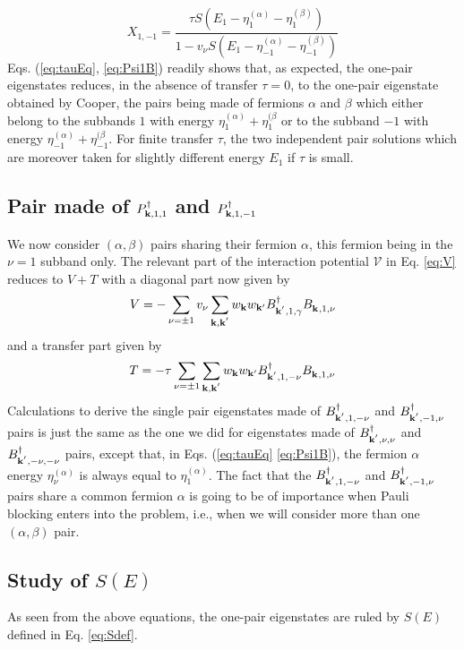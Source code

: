 \documentclass[11pt]{article} %
\begin{document}
\begin{equation}
X_{1,-1}=\frac{\tau{}S(E_1-\eta_{1}^{(\alpha)}-\eta_{1}^{(\beta)})}{1-v_{\nu}S(E_1-\eta_{-1}^{(\alpha)}-\eta_{-1}^{(\beta)})}
\end{equation}
Eqs. (\ref{eq:tauEq}, \ref{eq:Psi1B}) readily shows that, as expected, the one-pair eigenstates reduces, in the absence of transfer $\tau=0$, to the one-pair eigenstate obtained by Cooper, the pairs being made of fermions $\alpha$ and $\beta$ which either belong to the subbands $1$ with energy $\eta^{(\alpha)}_{1}+\eta^{(\beta}_{1}$ or to the subband $-1$ with energy $\eta^{(\alpha)}_{-1}+\eta^{(\beta}_{-1}$.  For finite transfer $\tau$, the two independent pair solutions which are moreover taken for slightly different energy $E_{1}$ if $\tau$ is small. 

\subsection{Pair made of $P^{\dagger}_{\mathbf{k},1,1}$ and $P^{\dagger}_{\mathbf{k},1,-1}$}
We now consider $(\alpha,\beta)$ pairs sharing their fermion $\alpha$, this fermion being in the $\nu=1$ subband only.  The relevant part of the interaction potential $\mathcal{V}$ in Eq. \ref{eq:V} reduces to $V+T$ with a diagonal part now given by  
\begin{equation}
V=-\sum_{\nu=\pm1}v_{\nu}\sum_{\mathbf{k},\mathbf{k}^{'}}
w_{\mathbf{k}}w_{\mathbf{k}'}
B^{\dagger}_{\mathbf{k}^{'},1,\gamma}
B^{}_{\mathbf{k}^{ },1,\nu}
\end{equation}
and a transfer part given by 
\begin{equation}
T=-\tau\sum_{\nu=\pm1}\sum_{\mathbf{k},\mathbf{k}^{'}}
w_{\mathbf{k}}w_{\mathbf{k}'}
B^{\dagger}_{\mathbf{k}^{'},1,-\nu}
B^{}_{\mathbf{k}^{ },1,\nu}
\end{equation}
Calculations to derive the single pair eigenstates made of $B^{\dagger}_{\mathbf{k}^{'},1,-\nu}$ and $B^{\dagger}_{\mathbf{k}^{'},-1,\nu}$ pairs is just the same as the one we did for eigenstates made of $B^{\dagger}_{\mathbf{k}^{'},\nu,\nu}$ and $B^{\dagger}_{\mathbf{k}^{'},-\nu,-\nu}$ pairs, except that, in Eqs. (\ref{eq:tauEq} \ref{eq:Psi1B}), the fermion $\alpha$ energy $\eta^{(\alpha)}_{\nu}$ is always equal to   $\eta^{(\alpha)}_1$.  The fact that the $B^{\dagger}_{\mathbf{k}^{'},1,-\nu}$ and $B^{\dagger}_{\mathbf{k}^{'},-1,\nu}$ pairs share a common fermion $\alpha$ is going to be of importance when Pauli blocking enters into the problem, i.e., when we will consider more than one $(\alpha,\beta)$ pair.  

\subsection{Study of $S(E)$}
As seen from the above equations, the one-pair eigenstates are ruled by $S(E)$ defined in Eq. \ref{eq:Sdef}. 
\end{document}

